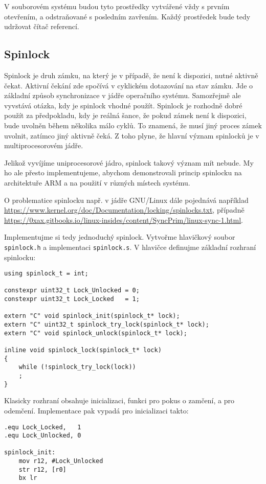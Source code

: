 \documentclass{article}
\begin{document}
V souborovém systému budou tyto prostředky vytvářené vždy s prvním otevřením, a odstraňované s posledním zavřením. Každý prostředek bude tedy udržovat čítač referencí.

\subsection{Spinlock}

Spinlock je druh zámku, na který je v případě, že není k dispozici, nutné aktivně čekat. Aktivní čekání zde spočívá v cyklickém dotazování na stav zámku. Jde o základní způsob synchronizace v jádře operačního systému. Samozřejmě ale vyvstává otázka, kdy je spinlock vhodné použít. Spinlock je rozhodně dobré použít za předpokladu, kdy je reálná šance, že pokud zámek není k dispozici, bude uvolněn během několika málo cyklů. To znamená, že musí jiný proces zámek uvolnit, zatímco jiný aktivně čeká. Z toho plyne, že hlavní význam spinlocků je v multiprocesorovém jádře.

Jelikož vyvíjíme uniprocesorové jádro, spinlock takový význam mít nebude. My ho ale přesto implementujeme, abychom demonstrovali princip spinlocku na architektuře ARM a na použití v různých místech systému.

O problematice spinlocku např. v jádře GNU/Linux dále pojednává například \url{https://www.kernel.org/doc/Documentation/locking/spinlocks.txt}, případně \url{https://0xax.gitbooks.io/linux-insides/content/SyncPrim/linux-sync-1.html}.

Implementujme si tedy jednoduchý spinlock. Vytvořme hlavičkový soubor \texttt{spinlock.h} a implementaci \texttt{spinlock.s}. V hlavičce definujme základní rozhraní spinlocku:
\begin{lstlisting}
using spinlock_t = int;

constexpr uint32_t Lock_Unlocked = 0;
constexpr uint32_t Lock_Locked   = 1;

extern "C" void spinlock_init(spinlock_t* lock);
extern "C" uint32_t spinlock_try_lock(spinlock_t* lock);
extern "C" void spinlock_unlock(spinlock_t* lock);

inline void spinlock_lock(spinlock_t* lock)
{
	while (!spinlock_try_lock(lock))
	;
}
\end{lstlisting}
Klasicky rozhraní obsahuje inicializaci, funkci pro pokus o zamčení, a pro odemčení. Implementace pak vypadá pro inicializaci takto:
\begin{lstlisting}
.equ Lock_Locked,   1
.equ Lock_Unlocked, 0

spinlock_init:
	mov r12, #Lock_Unlocked
	str r12, [r0]
	bx lr
\end{lstlisting}
\end{document}
